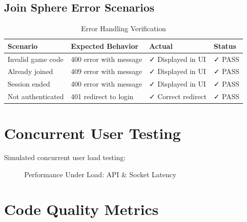 \documentclass[12pt,a4paper]{report}
\newcommand{\rA}{\rowcolor{white}}
\newcommand{\rB}{\rowcolor{lightgray}}
\newcommand{\rH}{\rowcolor{headcol}}
\begin{document}
\subsection{Join Sphere Error Scenarios}

\begin{table}[H]
  \centering
  \footnotesize
  \begin{tabular}{|l|l|l|l|}
    \hline
    \rH \textbf{Scenario} & \textbf{Expected Behavior} & \textbf{Actual} & \textbf{Status} \\
    \hline
    \rA Invalid game code & 400 error with message & ✓ Displayed in UI & ✓ PASS \\
    \hline
    \rB Already joined & 409 error with message & ✓ Displayed in UI & ✓ PASS \\
    \hline
    \rA Session ended & 400 error with message & ✓ Displayed in UI & ✓ PASS \\
    \hline
    \rB Not authenticated & 401 redirect to login & ✓ Correct redirect & ✓ PASS \\
    \hline
  \end{tabular}
  \caption{Error Handling Verification}
  \label{tab:error_tests}
\end{table}

\section{Concurrent User Testing}

Simulated concurrent user load testing:

\begin{figure}[H]
  \centering
  \caption{Performance Under Load: API \& Socket Latency}
\end{figure}

\section{Code Quality Metrics}
\end{document}
